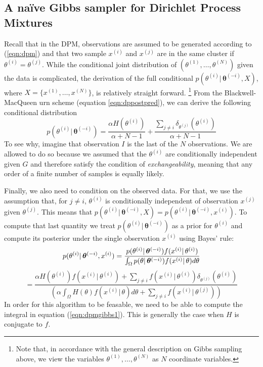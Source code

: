 \documentclass[final,3p,times,twocolumn]{elsarticle}
\let\bs\boldsymbol
\begin{document}
\subsection{A na{\"i}ve Gibbs sampler for Dirichlet Process Mixtures}
Recall that in the DPM, observations are assumed to be generated according to (\ref{eqn:dpm}) and that two sample $x^{(i)}$ and $x^{(j)}$ are in the same cluster if $\theta^{(i)}=\theta^{(j)}$.
While the conditional joint distribution of $(\theta^{(1)},\dots,\theta^{(N)})$ given the data is complicated, the derivation of the full conditional $p(\theta^{(i)}|\,\bs\theta^{(-i)},X)$, where $X=\{x^{(1)},\dots,x^{(N)}\}$, is relatively straight forward.
\footnote{Note that, in accordance with the general description on Gibbs sampling above, we view the variables $\theta^{(1)},\dots,\theta^{(N)}$ as $N$ coordinate variables.}
From the Blackwell-MacQueen urn scheme (equation \ref{eqn:dppostpred}), we can derive the following conditional distribution
\begin{equation}
\label{eqn:dpmpostpred}
p(\theta^{(i)}|\,\bs\theta^{(-i)}) = \frac{\alpha H(\theta^{(i)})}{\alpha+N-1} +\frac{\sum_{j\neq i}\delta_{\theta^{(j)}}(\theta^{(i)})}{\alpha+N-1}
\end{equation}
To see why, imagine that observation $I$ is the last of the $N$ observations.
We are allowed to do so because we assumed that the $\theta^{(i)}$ are conditionally independent given $G$ and therefore satisfy the condition of \emph{exchangeability}, meaning that any order of a finite number of samples is equally likely.

Finally, we also need to condition on the observed data.
For that, we use the assumption that, for $j\neq i$, $\theta^{(i)}$ is conditionally independent of observation $x^{(j)}$ given $\theta^{(j)}$.
This means that $p(\theta^{(i)}|\,\bs\theta^{(-i)},X) = p(\theta^{(i)}|\,\bs\theta^{(-i)},x^{(i)})$.
To compute that last quantity we treat $p(\theta^{(i)}|\,\bs\theta^{(-i)})$ as a prior for $\theta^{(i)}$ and compute its posterior under the single observation $x^{(i)}$ using Bayes' rule:
\begin{equation}
\label{eqn:dpmgibbs1}
p(\theta^{(i)}|\,\bs\theta^{(-i)},x^{(i)}) = \frac{p(\theta^{(i)}|\,\bs\theta^{(-i)})f(x^{(i)}|\,\theta^{(i)})}{\int_\Omega p(\theta|\,\bs\theta^{(-i)})f(x^{(i)}|\,\theta) d\theta}\\
\end{equation}
\begin{equation*}
=\frac{\alpha H(\theta^{(i)})f(x^{(i)}|\,\theta^{(i)}) + \sum_{j\neq i}f(x^{(i)}|\,\theta^{(i)})\delta_{\theta^{(j)}}(\theta^{(i)})}{\left(\alpha\int_\Omega H(\theta)f(x^{(i)}|\,\theta)d\theta+\sum_{j \neq i}f(x^{(i)}|\,\theta^{(j)})\right)}
\end{equation*}
In order for this algorithm to be feasable, we need to be able to compute the integral in equation (\ref{eqn:dpmgibbs1}).
This is generally the case when $H$ is conjugate to $f$.
\end{document}
